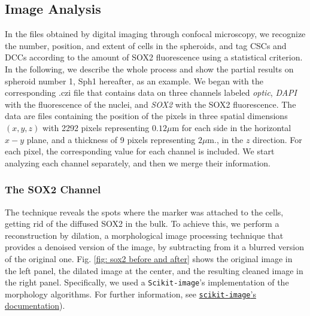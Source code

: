 \documentclass[fleqn,10pt]{wlscirep}
\begin{document}
\subsection*{Image Analysis}
In the files obtained by digital imaging through confocal microscopy, we recognize the number, position, and extent of cells in the spheroids, and tag CSCs and DCCs according to the amount of SOX2 fluorescence using a statistical criterion.  In the following, we describe the whole process and show the partial results on spheroid number 1, \textsf{Sph1} hereafter, as an example. We began with the corresponding \textsf{.czi} file that contains data on three channels labeled \emph{optic}, \emph{DAPI} with the fluorescence of the nuclei, and \emph{SOX2} with the SOX2 fluorescence. The data are files containing the position of the pixels in three spatial dimensions $(x, y, z)$ with 2292 pixels representing $ 0.12 \mu \text{m} $ for each side in the horizontal $x-y$ plane, and a thickness of 9 pixels representing  $2 \mu \text{m.}$, in the $z$ direction. For each pixel, the corresponding value for each channel is included. We start analyzing each channel separately, and then we merge their information. 

\subsubsection*{The SOX2 Channel}
The technique reveals the spots where the marker was attached to the cells, getting rid of the diffused SOX2 in the bulk. To achieve this, we perform a reconstruction by dilation, a morphological image processing technique that provides a denoised version of the image, by subtracting from it a blurred version of the original one. Fig. \ref{fig: sox2 before and after} shows the original image in the left panel, the dilated image at the center, and the resulting cleaned image in the right panel.
Specifically, we used a \lstinline{Scikit-image}'s implementation\cite{scikit-image} of the morphology algorithms. For further information, see \href{https://scikit-image.org/docs/stable/auto_examples/color_exposure/plot_regional_maxima.html#sphx-glr-auto-examples-color-exposure-plot-regional-maxima-py}{\lstinline{scikit-image}'s documentation}). 
\end{document}
